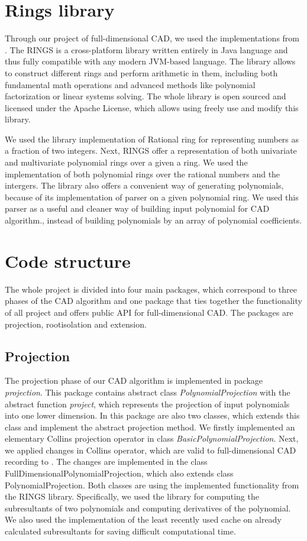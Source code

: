 \documentclass[
  digital, %
  twoside, %
  table,   %
  nolof,     %
  nolot,     %
]{fithesis3}
\begin{document}
\section{Rings library}
Through our project of full-dimensional CAD, we used the implementations from . The RINGS is a cross-platform library written entirely in Java language and thus fully compatible with any modern JVM-based language. The library allows to construct different rings and perform arithmetic in them, including both fundamental math operations and advanced methods like polynomial factorization or
linear systems solving\parencite{RINGS}. The whole library is open sourced and licensed under the Apache License, which allows using freely use and modify this library.

We used the library implementation of Rational ring for representing numbers as a fraction of two integers. 
Next, RINGS offer a representation of both univariate and multivariate polynomial rings over a given a ring. We used the implementation of both polynomial rings over the rational numbers and the intergers.
The library also offers a convenient way of generating polynomials, because of its implementation of parser on a given polynomial ring. We used this parser as a useful and cleaner way of building input polynomial for CAD algorithm., instead of building polynomials by an array of polynomial coefficients.



\section{Code structure}
The whole project is divided into four main packages, which correspond to three phases of the CAD algorithm and one package that ties together the functionality of all project and offers public API for full-dimensional CAD. The packages are projection, rootisolation and extension.

\subsection{Projection}
The projection phase of our CAD algorithm is implemented in package \textit{projection}. This package contains abstract class \textit{PolynomialProjection} with the abstract function \textit{project}, which represents the projection of input polynomials into one lower dimension. In this package are also two classes,  which extends this class and implement the abstract projection method. 
We firstly implemented an elementary Collins projection operator in class \textit{BasicPolynomialProjection}. 
Next, we applied changes in Collins operator, which are valid to full-dimensional CAD  recording to . The changes are implemented in the class FullDimensionalPolynomialProjection, which also extends class PolynomialProjection.
Both classes are using the implemented functionality from the RINGS library. Specifically, we used the library for computing the subresultants of two polynomials and computing derivatives of the polynomial. We also used the implementation of the least recently used cache on already calculated subresultants for saving difficult computational time.
\end{document}

